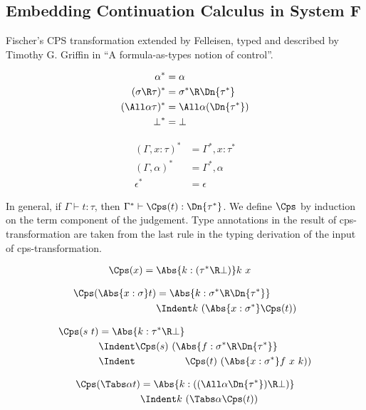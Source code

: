 \documentclass{amsart}
\begin{document}
\subsection{Embedding Continuation Calculus in System F}
\label{sec:cps}

Fischer's CPS transformation extended by Felleisen, typed and
described by Timothy G. Griffin in ``A formula-as-types notion of
control''.

\begin{align*}
\alpha^* & =
  \alpha
  \\
(\sigma \R \tau)^* & =
  \sigma^* \R \Dn{\tau^*}
  \\
(\All\alpha\tau)^* & =
  \All\alpha (\Dn{\tau^*})
  \\
\bot^* & =
  \bot
\end{align*}

\begin{align*}
(\Gamma, x:\tau)^* & =
  \Gamma^*, x:\tau^*
  \\
(\Gamma, \alpha)^* & =
  \Gamma^*, \alpha
  \\
\epsilon^* & =
  \epsilon
\end{align*}

In general, if $\Gamma \vdash t : \tau$, then
$\Gamma^* \vdash \Cps(t) : \Dn{\tau^*}$.
We define $\Cps$ by induction on the term component of the
judgement. Type annotations in the result of cps-transformation
are taken from the last rule in the typing derivation of the
input of cps-transformation.

\begin{align*}
\Cps(x)
& =
\Abs{k: (\tau^* \R \bot)} k~x
\end{align*}

\begin{align*}
\Cps(\Abs{x:\sigma}t)
& =
\Abs{k:\sigma^* \R \Dn{\tau^*}}
\\&\Indent
k~(\Abs{x:\sigma^*}\Cps(t))
\end{align*}

\begin{align*}
\Cps(s~t)
& =
\Abs{k:\tau^*\R\bot}
\\&\Indent
\Cps(s)~(\Abs{f:\sigma^* \R \Dn{\tau^*}}
\\&\Indent\hspace{5em}
\Cps(t)~(\Abs{x:\sigma^*}
f~x~k
))
\end{align*}

\begin{align*}
\Cps(\Tabs\alpha t)
& =
\Abs{k:((\All\alpha \Dn{\tau^*}) \R \bot)}
\\&\Indent
k~(\Tabs\alpha \Cps(t))
\end{align*}
\end{document}
